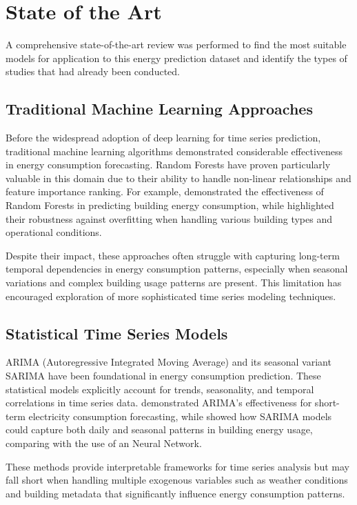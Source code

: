 \section{State of the Art} \label{sec}
A comprehensive state-of-the-art review was performed to find the most suitable models for application to this energy prediction dataset and identify the types of studies that had already been conducted.

\subsection{Traditional Machine Learning Approaches}
Before the widespread adoption of deep learning for time series prediction, traditional machine learning algorithms demonstrated considerable effectiveness in energy consumption forecasting. Random Forests have proven particularly valuable in this domain due to their ability to handle non-linear relationships and feature importance ranking. For example, \cite{ahmad2017random} demonstrated the effectiveness of Random Forests in predicting building energy consumption, while \cite{wang2018random} highlighted their robustness against overfitting when handling various building types and operational conditions.

Despite their impact, these approaches often struggle with capturing long-term temporal dependencies in energy consumption patterns, especially when seasonal variations and complex building usage patterns are present. This limitation has encouraged exploration of more sophisticated time series modeling techniques.

\subsection{Statistical Time Series Models}
ARIMA (Autoregressive Integrated Moving Average) and its seasonal variant SARIMA have been foundational in energy consumption prediction. These statistical models explicitly account for trends, seasonality, and temporal correlations in time series data. \cite{chujai2013time} demonstrated ARIMA's effectiveness for short-term electricity consumption forecasting, while \cite{Camara2016} showed how SARIMA models could capture both daily and seasonal patterns in building energy usage, comparing with the use of an Neural Network.

These methods provide interpretable frameworks for time series analysis but may fall short when handling multiple exogenous variables such as weather conditions and building metadata that significantly influence energy consumption patterns.

